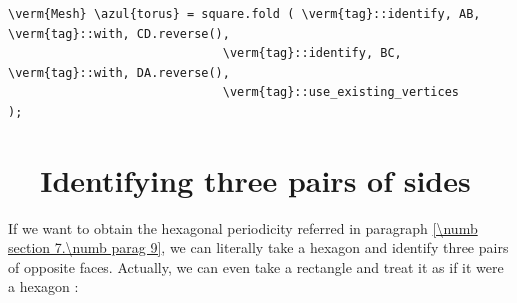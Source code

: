 \begin{Verbatim}[commandchars=\\\{\},formatcom=\small\tt,frame=single,
   label=parag-\ref{\numb section 7.\numb parag 15}.cpp,rulecolor=\color{coment},
   baselinestretch=0.94,framesep=2mm                                             ]
   \verm{Mesh} \azul{torus} = square.fold ( \verm{tag}::identify, AB, \verm{tag}::with, CD.reverse(),
                              \verm{tag}::identify, BC, \verm{tag}::with, DA.reverse(),
                              \verm{tag}::use_existing_vertices                 );
\end{Verbatim}


\section{~~Identifying three pairs of sides}\label{\numb section 7.\numb parag 16}

If we want to obtain the hexagonal periodicity referred in paragraph
\ref{\numb section 7.\numb parag 9}, we can literally take a hexagon and
identify three pairs of opposite faces.
Actually, we can even take a rectangle and treat it as if it were a hexagon :

